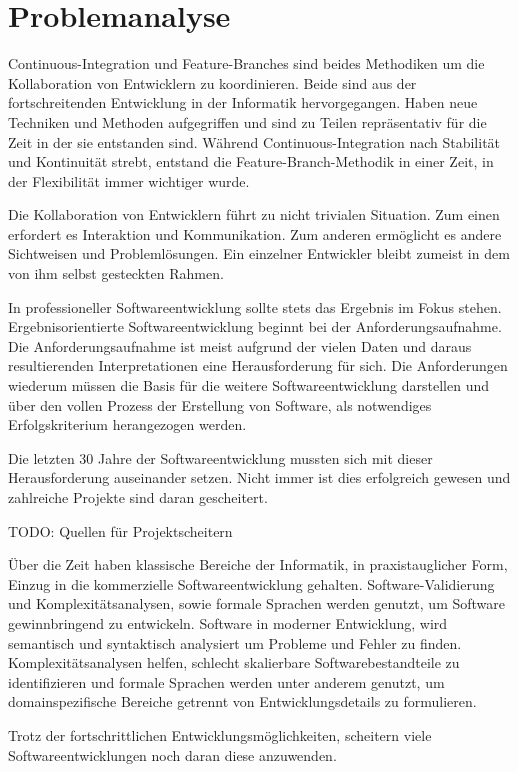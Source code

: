 \chapter{Problemanalyse}

Continuous-Integration und Feature-Branches sind beides Methodiken um die Kollaboration von Entwicklern zu koordinieren. Beide sind aus der fortschreitenden Entwicklung in der Informatik hervorgegangen. Haben neue Techniken und Methoden aufgegriffen und sind zu Teilen repräsentativ für die Zeit in der sie entstanden sind. Während Continuous-Integration nach Stabilität und Kontinuität strebt, entstand die Feature-Branch-Methodik in einer Zeit, in der Flexibilität immer wichtiger wurde.

Die Kollaboration von Entwicklern führt zu nicht trivialen Situation. Zum einen erfordert es Interaktion und Kommunikation. Zum anderen ermöglicht es andere Sichtweisen und Problemlösungen. Ein einzelner Entwickler bleibt zumeist in dem von ihm selbst gesteckten Rahmen.

In professioneller Softwareentwicklung sollte stets das Ergebnis im Fokus stehen. Ergebnisorientierte Softwareentwicklung beginnt bei der Anforderungsaufnahme. Die Anforderungsaufnahme ist meist aufgrund der vielen Daten und daraus resultierenden Interpretationen eine Herausforderung für sich. Die Anforderungen wiederum müssen die Basis für die weitere Softwareentwicklung darstellen und über den vollen Prozess der Erstellung von Software, als notwendiges Erfolgskriterium herangezogen werden.

Die letzten 30 Jahre der Softwareentwicklung mussten sich mit dieser Herausforderung auseinander setzen. Nicht immer ist dies erfolgreich gewesen und zahlreiche Projekte sind daran gescheitert.

TODO: Quellen für Projektscheitern

Über die Zeit haben klassische Bereiche der Informatik, in praxistauglicher Form, Einzug in die kommerzielle Softwareentwicklung gehalten. Software-Validierung und Komplexitätsanalysen, sowie formale Sprachen werden genutzt, um Software gewinnbringend zu entwickeln. Software in moderner Entwicklung, wird semantisch und syntaktisch analysiert um Probleme und Fehler zu finden. Komplexitätsanalysen helfen, schlecht skalierbare Softwarebestandteile zu identifizieren und formale Sprachen werden unter anderem genutzt, um domainspezifische Bereiche getrennt von Entwicklungsdetails zu formulieren.

Trotz der fortschrittlichen Entwicklungsmöglichkeiten, scheitern viele Softwareentwicklungen noch daran diese anzuwenden.

